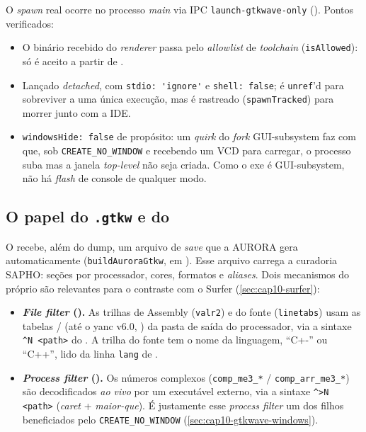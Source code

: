 O \emph{spawn} real ocorre no processo \emph{main} via IPC
\lstinline|launch-gtkwave-only| (). Pontos verificados:

\begin{itemize}
  \item O binário recebido do \emph{renderer} passa pelo \emph{allowlist} de
        \emph{toolchain} (\lstinline|isAllowed|):  só é aceito a
        partir de .
  \item Lançado \emph{detached}, com \lstinline|stdio: 'ignore'| e
        \lstinline|shell: false|; é \lstinline|unref|'d para sobreviver a uma única
        execução, mas é rastreado (\lstinline|spawnTracked|) para morrer junto com
        a IDE.
  \item \lstinline|windowsHide: false| de propósito: um \emph{quirk} do
        \emph{fork} GUI-subsystem faz com que, sob \lstinline|CREATE_NO_WINDOW| e
        recebendo um VCD para carregar, o processo suba mas a janela \emph{top-level}
        não seja criada. Como o exe é GUI-subsystem, não há \emph{flash} de console
        de qualquer modo.
\end{itemize}

\subsection{O papel do \texttt{.gtkw} e do }
\label{sec:cap10-gtkwave-gtkw-fst2vcd}

O  recebe, além do dump, um arquivo de \emph{save}  que a
AURORA gera automaticamente (\lstinline|buildAuroraGtkw|, em
). Esse arquivo carrega a curadoria SAPHO:
seções por processador, cores, formatos e \emph{aliases}. Dois mecanismos do
próprio  são relevantes para o contraste com o Surfer (\autoref{sec:cap10-surfer}):

\begin{itemize}
  \item \textbf{\emph{File filter} ().} As trilhas de Assembly
        (\lstinline|valr2|) e do fonte (\lstinline|linetabs|) usam as tabelas
         /  (até o yanc v6.0,
        ) da pasta de saída do processador, via a sintaxe
        \lstinline|^N <path>| do . A trilha do fonte tem o nome da
        linguagem, \enquote{C+-} ou \enquote{C++}, lido da linha
        \lstinline|lang| de .
  \item \textbf{\emph{Process filter} ().} Os números complexos
        (\lstinline|comp_me3_*| / \lstinline|comp_arr_me3_*|) são decodificados
        \emph{ao vivo} por um executável externo, via a sintaxe
        \lstinline|^>N <path>| (\emph{caret} + \emph{maior-que}). É justamente esse
        \emph{process filter} um dos filhos beneficiados pelo
        \lstinline|CREATE_NO_WINDOW| (\autoref{sec:cap10-gtkwave-windows}).
\end{itemize}

